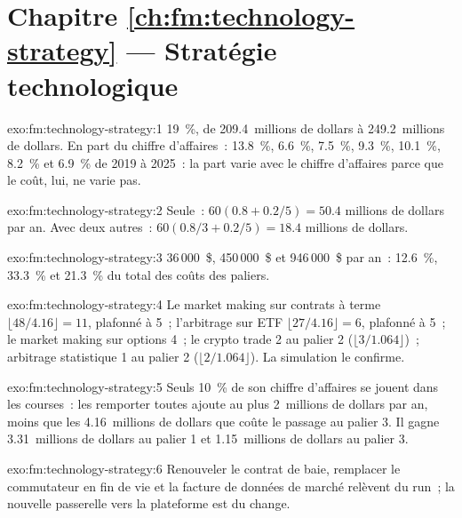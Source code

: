 \section*{Chapitre \ref{ch:fm:technology-strategy} --- Stratégie technologique}

\begin{solution}{exo:fm:technology-strategy:1}
19~\%, de 209.4~millions de dollars à 249.2~millions de dollars. En part du chiffre d'affaires~: 13.8~\%, 6.6~\%, 7.5~\%, 9.3~\%, 10.1~\%, 8.2~\% et 6.9~\% de 2019 à 2025~: la
part varie avec le chiffre d'affaires parce que le coût, lui, ne varie pas.
\end{solution}

\begin{solution}{exo:fm:technology-strategy:2}
Seule~: $60(0.8+0.2/5)=50.4$ millions de dollars par an. Avec deux autres~: $60(0.8/3+0.2/5)=18.4$ millions de dollars.
\end{solution}

\begin{solution}{exo:fm:technology-strategy:3}
36\,000~\$, 450\,000~\$ et 946\,000~\$ par an~: 12.6~\%, 33.3~\% et 21.3~\% du total des coûts des paliers.
\end{solution}

\begin{solution}{exo:fm:technology-strategy:4}
Le market making sur contrats à terme $\lfloor48/4.16\rfloor=11$, plafonné à 5~; l'arbitrage sur ETF $\lfloor27/4.16\rfloor=6$, plafonné à 5~; le market making sur options 4~;
le crypto trade 2 au palier 2 ($\lfloor3/1.064\rfloor$)~; arbitrage statistique 1 au palier 2 ($\lfloor2/1.064\rfloor$). La simulation le confirme.
\end{solution}

\begin{solution}{exo:fm:technology-strategy:5}
Seuls 10~\% de son chiffre d'affaires se jouent dans les courses~: les remporter toutes ajoute au plus 2~millions de dollars par an, moins que les 4.16~millions de dollars que coûte le passage
au palier 3. Il gagne 3.31~millions de dollars au palier 1 et 1.15~millions de dollars au palier 3.
\end{solution}

\begin{solution}{exo:fm:technology-strategy:6}
Renouveler le contrat de baie, remplacer le commutateur en fin de vie et la facture de données de marché relèvent du run~; la nouvelle passerelle vers la plateforme est du change.
\end{solution}

